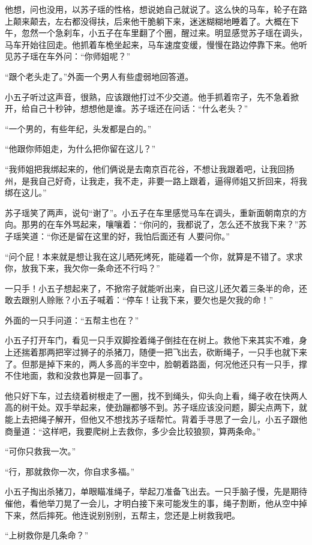 他想，问也没用，以苏子瑶的性格，想说她自己就说了。这么快的马车，轮子在路上颠来颠去，左右都没得扶，后来他干脆躺下来，迷迷糊糊地睡着了。大概在下午，忽然一个急刹车，小五子在车里翻了个圈，醒过来。明显感觉苏子瑶在调头，马车开始往回走。他抓着车桅坐起来，马车速度变缓，慢慢在路边停靠下来。他听见苏子瑶在车外问：“你师姐呢？”

“跟个老头走了。”外面一个男人有些虚弱地回答道。

小五子听过这声音，很熟，应该跟他打过不少交道。他手抓着帘子，先不急着掀开，给自己十秒钟，想想他是谁。苏子瑶还在问话：“什么老头？”

“一个男的，有些年纪，头发都是白的。”

“他跟你师姐走，为什么把你留在这儿？”

“我师姐把我绑起来的，他们俩说是去南京百花谷，不想让我跟着吧，让我回扬州，是我自己好奇，让我走，我不走，非要一路上跟着，逼得师姐又折回来，将我绑在这儿。”

苏子瑶笑了两声，说句“谢了”。小五子在车里感觉马车在调头，重新面朝南京的方向。那男的在车外骂起来，嚷嚷着：“你问的，我都说了，怎么还不放我下来？”苏子瑶笑道：“你还是留在这里的好，我怕后面还有
人要问你。”

“问个屁！本来就是想让我在这儿晒死烤死，能碰着一个你，就算是不错了。求求你，放我下来，我欠你一条命还不行吗？”

一只手！小五子想起来了，不掀帘子就能听出来，自已这儿还欠着三条半的命，还敢去跟别人赊账？小五子喊着：“停车！让我下来，要欠也是欠我的命！”

外面的一只手问道：“五帮主也在？”

小五子打开车门，看见一只手双脚拴着绳子倒挂在在树上。救他下来其实不难，身上还揣着那两把宰过狮子的杀猪刀，随便一把飞出去，砍断绳子，一只手也就下来了。但那是掉下来的，两人多高的半空中，脸朝着路面，何况他还只有一只手，撑不住地面，救和没救也算是一回事了。

他只好下车，过去绕着树根走了一圈，找不到绳头，仰头向上看，绳子收在快两人高的树干处。双手举起来，使劲蹦都够不到。苏子瑶应该没问题，脚尖点两下，就能上去把绳子解开，但他又不想找苏子瑶帮忙。背着手寻思了一会儿，小五子跟他商量道：“这样吧，我要爬树上去救你，多少会比较狼狈，算两条命。”

“可你只救我一次。”

“行，那就救你一次，你自求多福。”

小五子掏出杀猪刀，单眼瞄准绳子，举起刀准备飞出去。一只手脑子慢，先是期待催他，看他举刀晃了一会儿，才明白接下来可能发生的事，绳子割断，他从空中掉下来，然后摔死。他连说别别别，五帮主，您还是上树救我吧。

“上树救你是几条命？”

